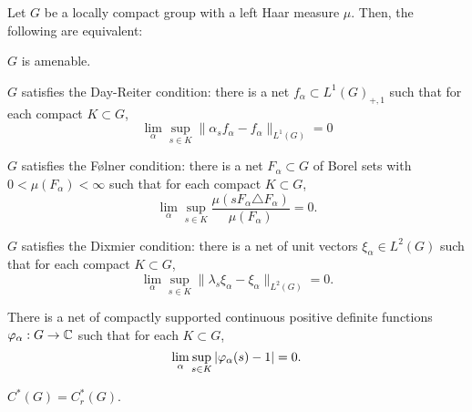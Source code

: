 \documentclass{../../small}
\begin{document}
\begin{thm}
Let $G$ be a locally compact group with a left Haar measure $\mu$.
Then, the following are equivalent:
\begin{parts}
\item $G$ is amenable.
\item $G$ satisfies the Day-Reiter condition: there is a net $f_\alpha\subset L^1(G)_{+,1}$ such that for each compact $K\subset G$,
\[\lim_\alpha\sup_{s\in K}\|\alpha_sf_\alpha-f_\alpha\|_{L^1(G)}=0\]
\item $G$ satisfies the F\o lner condition: there is a net $F_\alpha\subset G$ of Borel sets with $0<\mu(F_\alpha)<\infty$ such that for each compact $K\subset G$,
\[\lim_\alpha\sup_{s\in K}\frac{\mu(sF_\alpha\triangle F_\alpha)}{\mu(F_\alpha)}=0.\]
\item $G$ satisfies the Dixmier condition: there is a net of unit vectors $\xi_\alpha\in L^2(G)$ such that for each compact $K\subset G$,
\[\lim_\alpha\sup_{s\in K}\|\lambda_s\xi_\alpha-\xi_\alpha\|_{L^2(G)}=0.\]
\item There is a net of compactly supported continuous positive definite functions $\varphi_\alpha:G\to\mathbb{C}$ such that for each $K\subset G$,
\[\lim_\alpha\sup_{s\in K}|\varphi_\alpha(s)-1|=0.\]
\item $C^*(G)=C_r^*(G)$.
\end{parts}
\end{thm}
\end{document}

